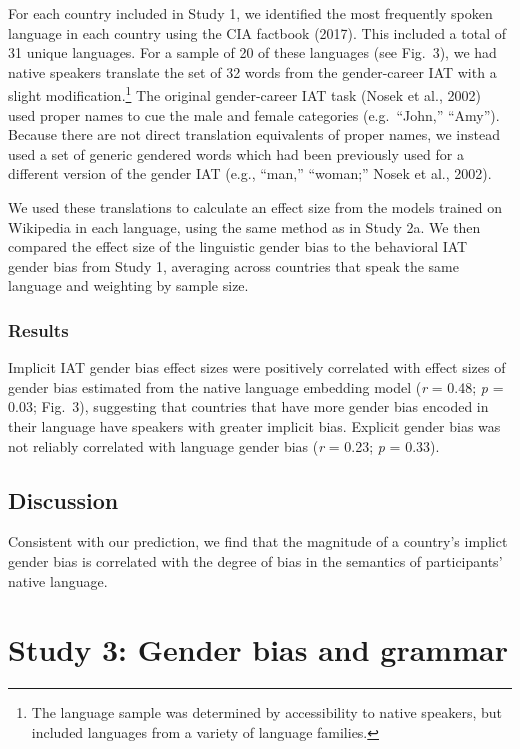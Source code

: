 \documentclass[10pt, letterpaper]{article}
\begin{document}
For each country included in Study 1, we identified the most frequently
spoken language in each country using the CIA factbook (2017). This
included a total of 31 unique languages. For a sample of 20 of these
languages (see Fig.~3), we had native speakers translate the set of 32
words from the gender-career IAT with a slight
modification.\footnote{The language sample was determined by accessibility to native speakers, but included languages from a variety of language families.}
The original gender-career IAT task (Nosek et al., 2002) used proper
names to cue the male and female categories (e.g.~``John,'' ``Amy'').
Because there are not direct translation equivalents of proper names, we
instead used a set of generic gendered words which had been previously
used for a different version of the gender IAT (e.g., ``man,''
``woman;'' Nosek et al., 2002).

We used these translations to calculate an effect size from the models
trained on Wikipedia in each language, using the same method as in Study
2a. We then compared the effect size of the linguistic gender bias to
the behavioral IAT gender bias from Study 1, averaging across countries
that speak the same language and weighting by sample size.

\subsubsection{Results}\label{results-2}

Implicit IAT gender bias effect sizes were positively correlated with
effect sizes of gender bias estimated from the native language embedding
model (\emph{r} = 0.48; \emph{p} = 0.03; Fig.~3), suggesting that
countries that have more gender bias encoded in their language have
speakers with greater implicit bias. Explicit gender bias was not
reliably correlated with language gender bias (\emph{r} = 0.23; \emph{p}
= 0.33).

\subsection{Discussion}\label{discussion-1}

Consistent with our prediction, we find that the magnitude of a
country's implict gender bias is correlated with the degree of bias in
the semantics of participants' native language.

\section{Study 3: Gender bias and
grammar}\label{study-3-gender-bias-and-grammar}
\end{document}
